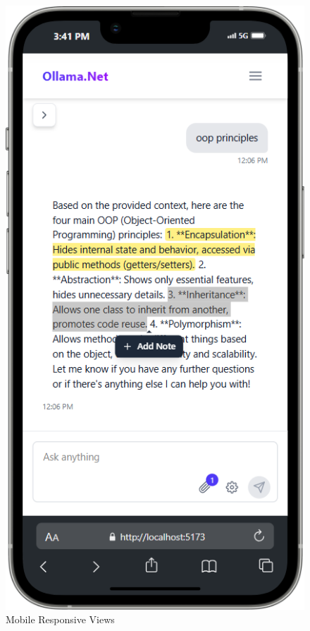 \begin{figure}[p]
    \centering
    \includegraphics[width=\textwidth]{./Chapter07/figures/mobile_responsive_views.png}
    \caption{Mobile Responsive Views}
    \label{fig:mobile-responsive-views}
\end{figure}
\clearpage


